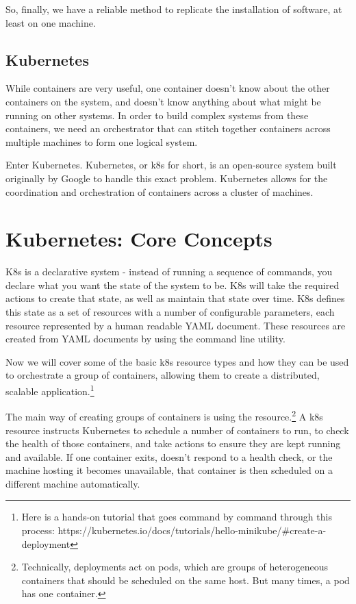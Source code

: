\documentclass[11pt,twoside]{article}
\begin{document}
So, finally, we have a reliable method to replicate the installation of software,
at least on one machine.

\subsection{Kubernetes}

While containers are very useful, one container doesn't know about the other containers
on the system, and doesn't know anything about what might be running on other systems.
In order to build complex systems from these containers, we need an orchestrator that
can stitch together containers across multiple machines to form one logical system.

Enter Kubernetes.
Kubernetes, or k8s for short, is an open-source system built originally by Google to handle this exact
problem.  Kubernetes allows for the coordination and orchestration of containers across
a cluster of machines.

\section{Kubernetes: Core Concepts}

K8s is a declarative system - instead of running
a sequence of commands, you declare what you want the state of the system to be.
K8s will take the required actions to create that state, as well as maintain
that state over time.  K8s defines this state as a set of resources with a number of
configurable parameters, each resource represented by a human readable YAML document.
These resources are created from YAML documents by using the  command line utility.

Now we will cover some of the basic k8s resource types and how they can be used to orchestrate
a group of containers, allowing them to create a distributed, scalable application.\footnote{
Here is a hands-on tutorial that goes command by command through this process:
https://kubernetes.io/docs/tutorials/hello-minikube/\#create-a-deployment}

The main way of creating groups of containers is using the  resource.\footnote{
Technically, deployments act on pods, which are groups of heterogeneous containers that should be
scheduled on the same host.  But many times, a pod has one container.}
A k8s  resource instructs Kubernetes to schedule a number of containers to run,
to check the health of those containers,
and take actions to ensure they are kept running and available.  If one container exits, doesn't respond
to a health check, or the machine hosting it becomes unavailable, that container is then scheduled
on a different machine automatically.
\end{document}
